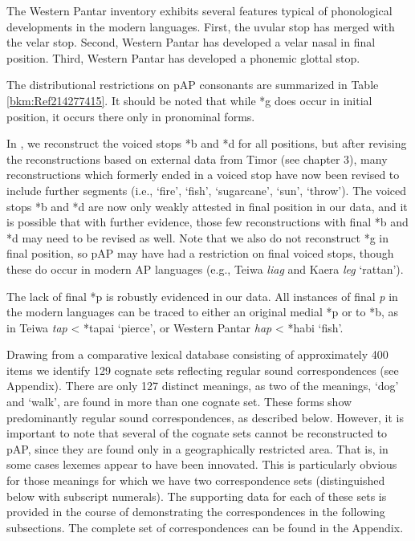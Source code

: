 The Western Pantar inventory exhibits several features typical of phonological developments in the modern languages. First, the uvular stop has merged with the velar stop. Second, Western Pantar has developed a velar nasal in final position. Third, Western Pantar has developed a phonemic glottal stop. 

The distributional restrictions on pAP consonants are summarized in Table \ref{bkm:Ref214277415}. It should be noted that while *g does occur in initial position, it occurs there only in pronominal forms. 



In \citet{HoltonEtAl2012}, we reconstruct the voiced stops *b and *d for all positions, but after revising the reconstructions based on external data from Timor (see chapter 3), many reconstructions which formerly ended in a voiced stop have now been revised to include further segments (i.e., `fire', `fish', `sugarcane', `sun', `throw'). The voiced stops *b and *d are now only weakly attested in final position in our data, and it is possible that with further evidence, those few reconstructions with final *b and *d may need to be revised as well. Note that we also do not reconstruct *g in final position, so pAP may have had a restriction on final voiced stops, though these do occur in modern AP languages (e.g., Teiwa \textit{lia{\textlengthmark}g} and Kaera \textit{ le{\textlengthmark}g} `rattan'). 

The lack of final *p is robustly evidenced in our data. All instances of final \textit{p }in the modern languages can be traced to either an original medial *p or to *b, as in Teiwa \textit{tap }{\textless} *tapai `pierce', or Western Pantar \textit{hap} {\textless} *habi `fish'. 

 Drawing from a comparative lexical database consisting of approximately 400 items we identify 129 cognate sets reflecting regular sound correspondences (see Appendix). There are only 127 distinct meanings, as two of the meanings, `dog' and `walk', are found in more than one cognate set. These forms show predominantly regular sound correspondences, as described below. However, it is important to note that several of the cognate sets cannot be reconstructed to pAP, since they are found only in a geographically restricted area. That is, in some cases lexemes appear to have been innovated. This is particularly obvious for those meanings for which we have two correspondence sets (distinguished below with subscript numerals). The supporting data for each of these sets is provided in the course of demonstrating the correspondences in the following subsections. The complete set of correspondences can be found in the Appendix. 

